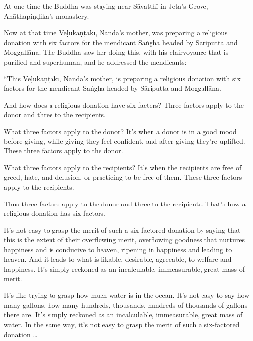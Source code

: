 \documentclass[12pt,openany]{book}%
\begin{document}
At one time the Buddha was staying near \textsanskrit{Sāvatthī} in Jeta’s Grove, \textsanskrit{Anāthapiṇḍika}’s monastery. 

Now at that time \textsanskrit{Veḷukaṇṭakī}, Nanda’s mother, was preparing a religious donation with six factors for the mendicant \textsanskrit{Saṅgha} headed by \textsanskrit{Sāriputta} and \textsanskrit{Moggallāna}. The Buddha saw her doing this, with his clairvoyance that is purified and superhuman, and he addressed the mendicants: 

“This \textsanskrit{Veḷukaṇṭakī}, Nanda’s mother, is preparing a religious donation with six factors for the mendicant \textsanskrit{Saṅgha} headed by \textsanskrit{Sāriputta} and \textsanskrit{Moggallāna}. 

And how does a religious donation have six factors? Three factors apply to the donor and three to the recipients. 

What three factors apply to the donor? It’s when a donor is in a good mood before giving, while giving they feel confident, and after giving they’re uplifted. These three factors apply to the donor. 

What three factors apply to the recipients? It’s when the recipients are free of greed, hate, and delusion, or practicing to be free of them. These three factors apply to the recipients. 

Thus three factors apply to the donor and three to the recipients. That’s how a religious donation has six factors. 

It’s not easy to grasp the merit of such a six-factored donation by saying that this is the extent of their overflowing merit, overflowing goodness that nurtures happiness and is conducive to heaven, ripening in happiness and leading to heaven. And it leads to what is likable, desirable, agreeable, to welfare and happiness. It’s simply reckoned as an incalculable, immeasurable, great mass of merit. 

It’s like trying to grasp how much water is in the ocean. It’s not easy to say how many gallons, how many hundreds, thousands, hundreds of thousands of gallons there are. It’s simply reckoned as an incalculable, immeasurable, great mass of water. In the same way, it’s not easy to grasp the merit of such a six-factored donation … 
\end{document}
